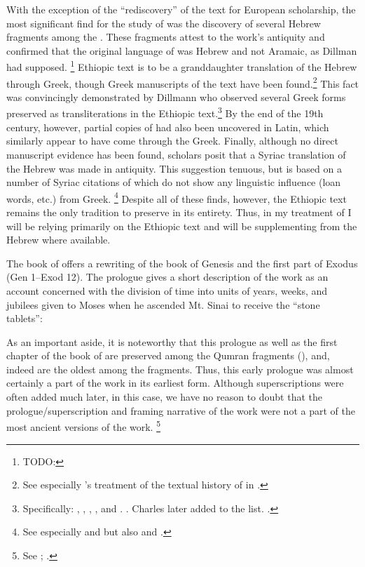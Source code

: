 With the exception of the ``rediscovery'' of the text for European scholarship, the most significant find for the study of \jub was the discovery of several Hebrew fragments among the \dss. These fragments  attest to the work's antiquity and confirmed that the original language of \jub was Hebrew and not Aramaic, as Dillman had supposed.%
        \footnote{TODO:}
Ethiopic text is to be a granddaughter translation of the Hebrew through Greek, though Greek manuscripts of the text have been found.\footnote{See especially \vanderkam's treatment of the textual history of \jub in \cite*[1--18]{vanderkam1977}.} This fact was convincingly demonstrated by Dillmann who observed several Greek forms preserved as transliterations in the Ethiopic text.\footnote{Specifically: , , , , and . \cite[88]{dillamnn_jbw1850}. Charles later added  to the list. \cite[xxx]{charles1902}.} By the end of the 19th century, however, partial copies of \jub had also been uncovered in Latin, which similarly appear to have come through the Greek. Finally, although no direct manuscript evidence has been found, \jub scholars posit that a Syriac translation of the Hebrew was made in antiquity. This suggestion tenuous, but is based on a number of Syriac citations of \jub which do not show any linguistic influence (loan words, etc.) from Greek.%
        \footnote{%
                See especially
                \cite[231--232]{tisserant_rb1921} and 
                \cite[xxix]{charles1902} but also 
                \cite[2:ix--x]{ceriani1861} and 
                \cite[x]{charles1895}.}
Despite all of these finds, however, the Ethiopic text remains the only tradition to preserve \jub in its entirety. Thus, in my treatment of \jub I will be relying primarily on the Ethiopic text and will be supplementing from the Hebrew where available.

The book of \jub offers a rewriting of the book of Genesis and the first part of Exodus (Gen 1--Exod 12).\autocite[1:17]{vanderkam2018}  The prologue gives a short description of the work as an account concerned with the division of time into units of years, weeks, and jubilees given to Moses when he ascended Mt. Sinai to receive the ``stone tablets'':

%
\noindent
As an important aside, it is noteworthy that this prologue as well as the first chapter of the book of \jub are preserved among the Qumran fragments (), and, indeed are the oldest among the \jub fragments. Thus, this early prologue was almost certainly a part of the work in its earliest form. Although superscriptions were often added much later, in this case, we have no reason to doubt that the prologue/superscription and framing narrative of the work were not a part of the most ancient versions of the work.%
    \footnote{See 
        \cite[1:125]{vanderkam2018};
        \cite[25]{vanderkam_metso-etal2010}.}

